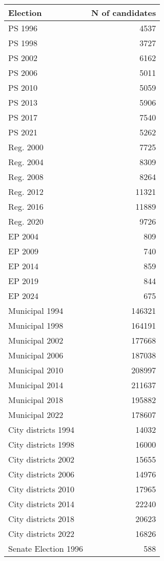 
\begin{tabular}{l|r}
\hline
Election & N of candidates\\
\hline
PS 1996 & 4537\\
\hline
PS 1998 & 3727\\
\hline
PS 2002 & 6162\\
\hline
PS 2006 & 5011\\
\hline
PS 2010 & 5059\\
\hline
PS 2013 & 5906\\
\hline
PS 2017 & 7540\\
\hline
PS 2021 & 5262\\
\hline
Reg. 2000 & 7725\\
\hline
Reg. 2004 & 8309\\
\hline
Reg. 2008 & 8264\\
\hline
Reg. 2012 & 11321\\
\hline
Reg. 2016 & 11889\\
\hline
Reg. 2020 & 9726\\
\hline
EP 2004 & 809\\
\hline
EP 2009 & 740\\
\hline
EP 2014 & 859\\
\hline
EP 2019 & 844\\
\hline
EP 2024 & 675\\
\hline
Municipal 1994 & 146321\\
\hline
Municipal 1998 & 164191\\
\hline
Municipal 2002 & 177668\\
\hline
Municipal 2006 & 187038\\
\hline
Municipal 2010 & 208997\\
\hline
Municipal 2014 & 211637\\
\hline
Municipal 2018 & 195882\\
\hline
Municipal 2022 & 178607\\
\hline
City districts 1994 & 14032\\
\hline
City districts 1998 & 16000\\
\hline
City districts 2002 & 15655\\
\hline
City districts 2006 & 14976\\
\hline
City districts 2010 & 17965\\
\hline
City districts 2014 & 22240\\
\hline
City districts 2018 & 20623\\
\hline
City districts 2022 & 16826\\
\hline
Senate Election 1996 & 588\\

\end{tabular}
